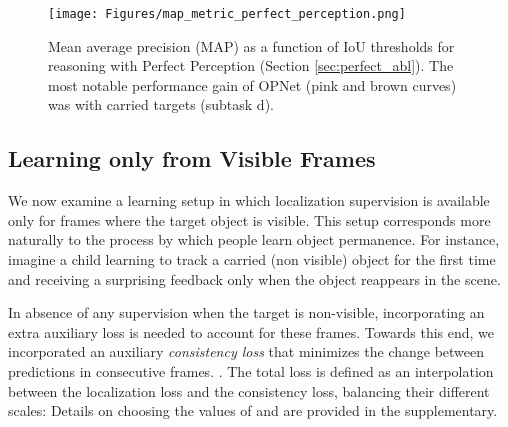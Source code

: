 \documentclass[]{llncs}
\newcommand{\secref}[1]{Section \ref{#1}}
\begin{document}
\begin{figure}[!h]
    \begin{center}
    \texttt{[image: Figures/map\_metric\_perfect\_perception.png]}
\caption{Mean average precision (MAP) as a function of IoU thresholds for reasoning with Perfect Perception (\secref{sec:perfect_abl}). The most notable performance gain of OPNet (pink and brown curves) was with carried targets (subtask d).    \label{fig:map_pp}}
    \end{center}
\end{figure}

\subsection{Learning only from Visible Frames}
\label{sect:abl}
We now examine a learning setup in which localization supervision is available only for frames where the target object is visible. This setup corresponds more naturally to the process by which people learn object permanence. For instance, imagine a child learning to track a carried (non visible) object for the first time and receiving a surprising feedback only when the object reappears in the scene.

In absence of any supervision when the target is non-visible, incorporating an extra auxiliary loss is needed to account for these frames. Towards this end, we incorporated an auxiliary \emph{consistency loss} that minimizes the change between predictions in consecutive frames. . The total loss is defined as an interpolation between the localization loss and the consistency loss, balancing their different scales: 
Details on choosing the values of  and  are provided in the supplementary.
\end{document}
